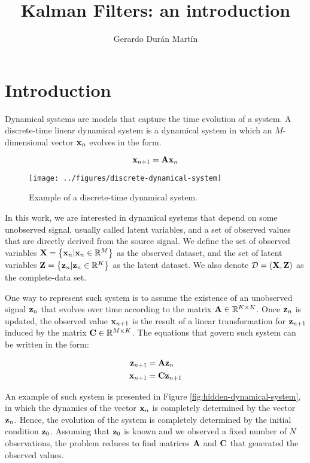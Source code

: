 \documentclass[11pt]{article}
\title{Kalman Filters: an introduction}
\author{Gerardo Durán Martín}
\numberwithin{equation}{section}
\newcommand{\x}{{\bf x}}
\newcommand{\z}{{\bf z}}
\begin{document}
\maketitle

\section{Introduction}

Dynamical systems are models that capture the time evolution of a system. A discrete-time linear dynamical system is a dynamical system in which an $M$-dimensional vector $\x_n$ evolves in the form.

\begin{equation}
	\x_{n+1} = {\bf A x}_n
\end{equation}

\begin{figure}[h!]
	\centering
	\texttt{[image: ../figures/discrete-dynamical-system]}
	\caption{Example of a discrete-time dynamical system.}
	\label{fig:discrete-dynamical-system}
\end{figure}



In this work, we are interested in dynamical systems that depend on some unobserved signal, usually called latent variables, and a set of observed values that are directly derived from the source signal. We define the set of observed variables ${\bf X}=\left\{\x_n \vert \x_n \in \mathbb{R}^M\right\}$ as the observed dataset, and the set of latent variables ${\bf Z}=\left\{\z_n \vert \z_n \in \mathbb{R}^K\right\}$ as the latent dataset. We also denote $\mathcal{D} = ({\bf X}, {\bf Z})$ as the complete-data set.

One way to represent such system is to assume the existence of an unobserved signal $\z_n$ that evolves over time according to the matrix ${\bf A}\in\mathbb{R}^{K\times K}$. Once $\z_{n}$ is updated, the observed value $\x_{n+1}$ is the result of a linear transformation for $\z_{n+1}$ induced by the matrix ${\bf C}\in \mathbb{R}^{M\times K}$. The equations that govern such system can be written in the form:

\begin{align*}
	\z_{n+1} &= {\bf A} \z_{n}\\
	\x_{n+1} &= {\bf C} \z_{n+1}
\end{align*}

An example of such system is presented in Figure \ref{fig:hidden-dynamical-system}, in which the dynamics of the vector $\x_n$ is completely determined by the vector $\z_n$. Hence, the evolution of the system is completely determined by the initial condition $\z_0$. Assuming that $\z_0$ is known and we observed a fixed number of $N$ observations, the problem reduces to find matrices ${\bf A}$ and ${\bf C}$ that generated the observed values.
\end{document}
